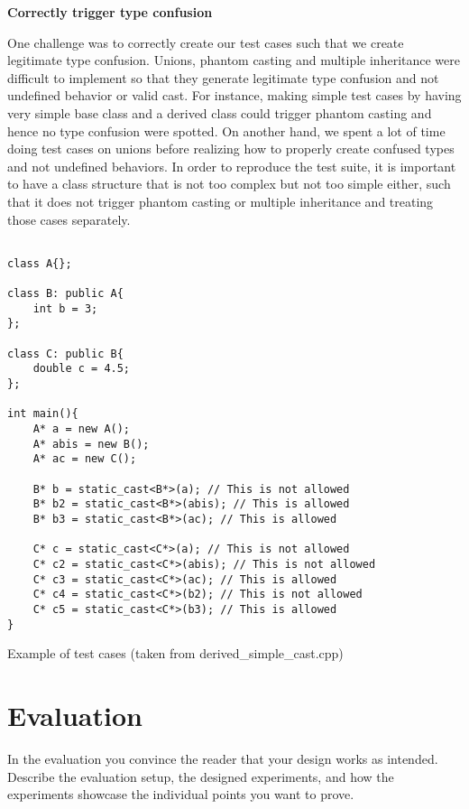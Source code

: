 \documentclass[a4paper,11pt,oneside]{report}
\begin{document}
\textbf{Correctly trigger type confusion}

\noindent{}One challenge was to correctly create our test cases such that we
create legitimate type confusion.  Unions, phantom casting and multiple
inheritance were difficult to implement so that they generate legitimate type
confusion and not undefined behavior or valid cast. For instance, making simple
test cases by having very simple base class and a derived class could trigger
phantom casting and hence no type confusion were spotted. On another hand, we
spent a lot of time doing test cases on unions before realizing how to properly
create confused types and not undefined behaviors.  In order to reproduce the
test suite, it is important to have a class structure that is not too complex
but not too simple either, such that it does not trigger phantom casting or
multiple inheritance and treating those cases separately.

\begin{listing}
       \begin{verbatim}

class A{};

class B: public A{
    int b = 3;
};

class C: public B{
    double c = 4.5;
}; 

int main(){
    A* a = new A();
    A* abis = new B();
    A* ac = new C();

    B* b = static_cast<B*>(a); // This is not allowed
    B* b2 = static_cast<B*>(abis); // This is allowed
    B* b3 = static_cast<B*>(ac); // This is allowed

    C* c = static_cast<C*>(a); // This is not allowed
    C* c2 = static_cast<C*>(abis); // This is not allowed
    C* c3 = static_cast<C*>(ac); // This is allowed
    C* c4 = static_cast<C*>(b2); // This is not allowed
    C* c5 = static_cast<C*>(b3); // This is allowed
}
       \end{verbatim}
       \caption{Example of test cases (taken from derived\_simple\_cast.cpp)}
       \label{lst:test_cases}
\end{listing}

\chapter{Evaluation}

In the evaluation you convince the reader that your design works as intended.
Describe the evaluation setup, the designed experiments, and how the
experiments showcase the individual points you want to prove.
\end{document}
